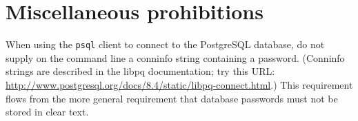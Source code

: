 \section{Miscellaneous prohibitions}

%
When using the \verb!psql! client to connect to the PostgreSQL database,
do not supply on the command line a conninfo string containing a password.
(Conninfo strings are described in the libpq documentation; try
this URL:
\url{http://www.postgresql.org/docs/8.4/static/libpq-connect.html}.) This
requirement flows from the more general requirement that database
passwords must not be stored in clear text.

